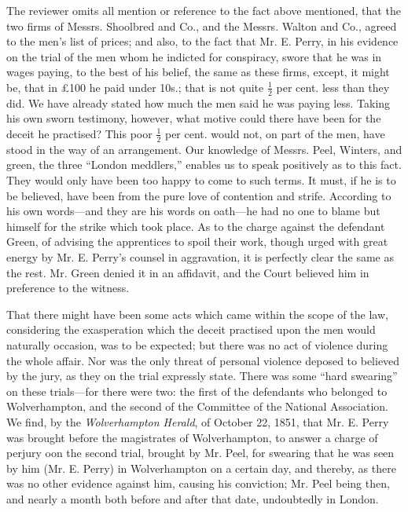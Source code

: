The reviewer omits all mention or reference to the fact above mentioned,
that the two firms of Messrs. Shoolbred and Co., and the Messrs. Walton
and Co., agreed to the men's list of prices; and also, to the fact that
Mr. E. Perry, in his evidence on the trial of the men whom he indicted
for conspiracy, swore that he was in wages paying, to the best of his
belief, the same as these firms, except, it might be, that in £100 he
paid under 10s.; that is not quite $\frac{1}{2}$ per cent. less than
they did. We have already stated how much the men said he was paying
less. Taking his own sworn testimony, however, what motive could there
have been for the deceit he practised? This poor $\frac{1}{2}$ per cent.
would not, on part of the men, have stood in the way of an arrangement.
Our knowledge of Messrs. Peel, Winters, and green, the three ``London
meddlers,'' enables us to speak positively as to this fact. They would
only have been too happy to come to such terms. It must, if he is to be
believed, have been from the pure love of contention and strife.
According to his own words---and they are his words on oath---he had no
one to blame but himself for the strike which took place. As to the
charge against the defendant Green, of advising the apprentices to spoil
their work, though urged with great energy by Mr. E. Perry's counsel in
aggravation, it is perfectly clear the same as the rest. Mr. Green
denied it in an affidavit, and the Court believed him in preference to
the witness.

That there might have been some acts which came within the scope of the
law, considering the exasperation which the deceit practised upon the
men would naturally occasion, was to be expected; but there was no act
of violence during the whole affair. Nor was the only threat of personal
violence deposed to believed by the jury, as they on the trial
expressly state. There was some ``hard swearing'' on these trials---for
there were two: the first of the defendants who belonged to
Wolverhampton, and the second of the Committee of the National
Association. We find, by the \textit{Wolverhampton Herald}, of October
22, 1851, that Mr. E. Perry was brought before the magistrates of
Wolverhampton, to answer a charge of perjury oon the second trial,
brought by Mr. Peel, for swearing that he was seen by him (Mr. E. Perry)
in Wolverhampton on a certain day, and thereby, as there was no other
evidence against him, causing his conviction; Mr. Peel being then, and
nearly a month both before and after that date, undoubtedly in London.

